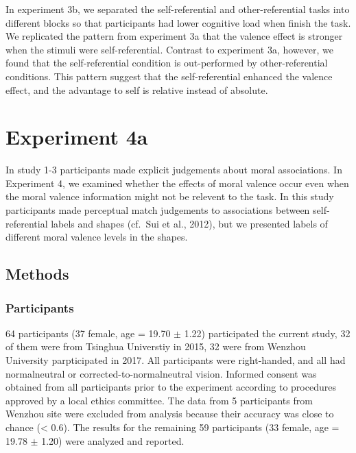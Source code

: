 \documentclass[man]{apa6}
\begin{document}
In experiment 3b, we separated the self-referential and other-referential tasks into different blocks so that participants had lower cognitive load when finish the task. We replicated the pattern from experiment 3a that the valence effect is stronger when the stimuli were self-referential. Contrast to experiment 3a, however, we found that the self-referential condition is out-performed by other-referential conditions. This pattern suggest that the self-referential enhanced the valence effect, and the advantage to self is relative instead of absolute.

\hypertarget{experiment-4a}{%
\section{Experiment 4a}\label{experiment-4a}}

In study 1-3 participants made explicit judgements about moral associations. In Experiment 4, we examined whether the effects of moral valence occur even when the moral valence information might not be relevent to the task. In this study participants made perceptual match judgements to associations between self-referential labels and shapes (cf.~Sui et al., 2012), but we presented labels of different moral valence levels in the shapes.

\hypertarget{methods-1}{%
\subsection{Methods}\label{methods-1}}

\hypertarget{participants-6}{%
\subsubsection{Participants}\label{participants-6}}

64 participants (37 female, age = 19.70 \(\pm\) 1.22) participated the current study, 32 of them were from Tsinghua Universtiy in 2015, 32 were from Wenzhou University parpticipated in 2017. All participants were right-handed, and all had normalneutral or corrected-to-normalneutral vision. Informed consent was obtained from all participants prior to the experiment according to procedures approved by a local ethics committee. The data from 5 participants from Wenzhou site were excluded from analysis because their accuracy was close to chance (\textless{} 0.6). The results for the remaining 59 participants (33 female, age = 19.78 \(\pm\) 1.20) were analyzed and reported.
\end{document}
